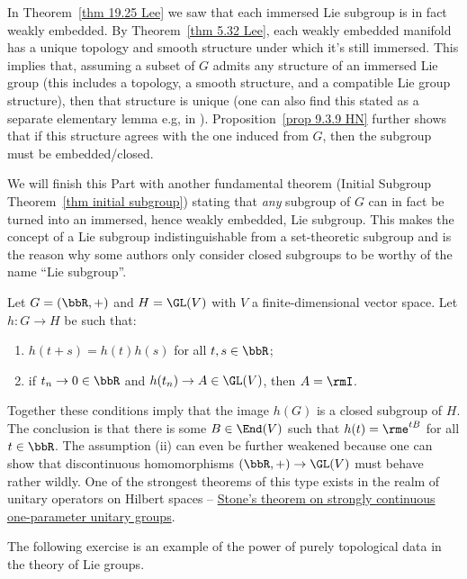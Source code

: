 \begin{rem}\label{rem structure of Lie subgroups}
    In Theorem~\ref{thm 19.25 Lee} we saw that each immersed Lie subgroup is in fact weakly embedded. By Theorem~\ref{thm 5.32 Lee}, each weakly embedded manifold has a unique topology and smooth structure under which it's still immersed. This implies that, assuming a subset of $G$ admits any structure of an immersed Lie group (this includes a topology, a smooth structure, and a compatible Lie group structure), then that structure is unique (one can also find this stated as a separate elementary lemma e.g, in \cite[Lem.~9.6.12]{HN}). Proposition~\ref{prop 9.3.9 HN} further shows that if this structure agrees with the one induced from $G$, then the subgroup must be embedded/closed. 
    
    We will finish this Part with another fundamental theorem (Initial Subgroup Theorem~\ref{thm initial subgroup}) stating that \emph{any} subgroup of $G$ can in fact be turned into an immersed, hence weakly embedded, Lie subgroup. This makes the concept of a Lie subgroup indistinguishable from a set-theoretic subgroup and is the reason why some authors only consider closed subgroups to be worthy of the name ``Lie subgroup''.
\end{rem}


\begin{example}
    Let $G=(\bbR,+)$ and $H=\GL(V)$ with $V$ a finite-dimensional vector space. Let $h:G\to H$ be such that:
    \begin{enumerate}[label=(\roman*)]
        \item $h(t+s)=h(t)h(s)$ for all $t,s\in\bbR$;
        \item if $t_n\to 0\in\bbR$ and $h(t_n)\to A\in\GL(V)$, then $A=\rmI$.
    \end{enumerate}
    Together these conditions imply that the image $h(G)$ is a closed subgroup of $H$. The conclusion is that there is some $B\in \End(V)$ such that $h(t)=\rme^{tB}$ for all $t\in \bbR$. The assumption (ii) can even be further weakened because one can show that discontinuous homomorphisms $(\bbR,+)\to \GL(V)$ must behave rather wildly. One of the strongest theorems of this type exists in the realm of unitary operators on Hilbert spaces -- \href{https://en.wikipedia.org/wiki/Stone%27s_theorem_on_one-parameter_unitary_groups}{Stone's theorem on strongly continuous one-parameter unitary groups}.
\end{example}

The following exercise is an example of the power of purely topological data in the theory of Lie groups.

